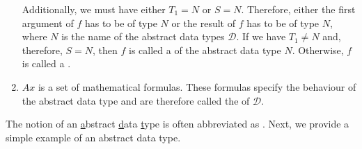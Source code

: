 \begin{enumerate}
      Additionally, we must have either $T_1 = N$ or $S = N$.  Therefore, either
      the first argument of $f$ has to be of type $N$ or the result of $f$ has to be of type 
      $N$, where $N$ is the name of the abstract data types $\mathcal{D}$.  If we have  $T_1 \not= N$ and, therefore,
      $S = N$, then $f$ is called a  of the abstract data type $N$.  
      Otherwise,  $f$ is called a  .
\item $Ax$ is a set of mathematical formulas.   These formulas 
      specify the behaviour of the abstract data type and are therefore called
      the  of $\mathcal{D}$.
\end{enumerate}
The notion of an \underline{a}bstract \underline{d}ata \underline{t}ype is often abbreviated as \textsc{}.
Next, we provide a simple example of an abstract data type.

